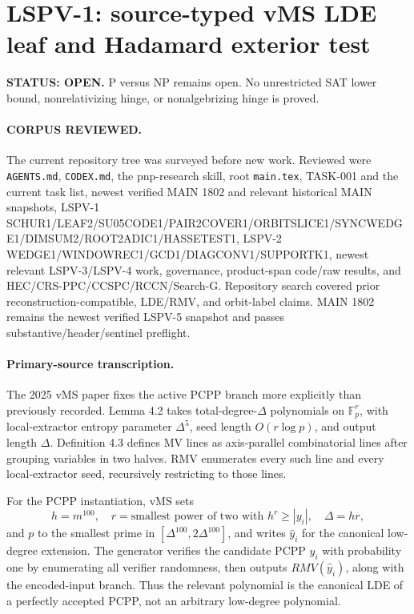 \documentclass[11pt]{article}
\begin{document}
\section*{LSPV-1: source-typed vMS LDE leaf and Hadamard exterior test}
\textbf{STATUS: OPEN.} P versus NP remains open. No unrestricted SAT lower bound, nonrelativizing hinge, or nonalgebrizing hinge is proved.

\paragraph{CORPUS REVIEWED.}
The current repository tree was surveyed before new work. Reviewed were \texttt{AGENTS.md}, \texttt{CODEX.md}, the pnp-research skill, root \texttt{main.tex}, TASK-001 and the current task list, newest verified MAIN 1802 and relevant historical MAIN snapshots, LSPV-1 SCHUR1/LEAF2/SU05CODE1/PAIR2COVER1/ORBITSLICE1/SYNCWEDGE1/DIMSUM2/ROOT2ADIC1/HASSETEST1, LSPV-2 WEDGE1/WINDOWREC1/GCD1/DIAGCONV1/SUPPORTK1, newest relevant LSPV-3/LSPV-4 work, governance, product-span code/raw results, and HEC/CRS-PPC/CCSPC/RCCN/Search-G. Repository search covered prior reconstruction-compatible, LDE/RMV, and orbit-label claims. MAIN 1802 remains the newest verified LSPV-5 snapshot and passes substantive/header/sentinel preflight.

\paragraph{Primary-source transcription.}
The 2025 vMS paper fixes the active PCPP branch more explicitly than previously recorded. Lemma 4.2 takes total-degree-$\Delta$ polynomials on $\mathbb F_p^r$, with local-extractor entropy parameter $\Delta^5$, seed length $O(r\log p)$, and output length $\Delta$. Definition 4.3 defines MV lines as axis-parallel combinatorial lines after grouping variables in two halves. RMV enumerates every such line and every local-extractor seed, recursively restricting to those lines.

For the PCPP instantiation, vMS sets
\[
h=m^{100},\quad r=\text{smallest power of two with }h^r\ge |y_i|,
\quad \Delta=hr,
\]
and $p$ to the smallest prime in $[\Delta^{100},2\Delta^{100}]$, and writes $\widehat y_i$ for the canonical low-degree extension. The generator verifies the candidate PCPP $y_i$ with probability one by enumerating all verifier randomness, then outputs $RMV(\widehat y_i)$, along with the encoded-input branch. Thus the relevant polynomial is the canonical LDE of a perfectly accepted PCPP, not an arbitrary low-degree polynomial.
\end{document}
